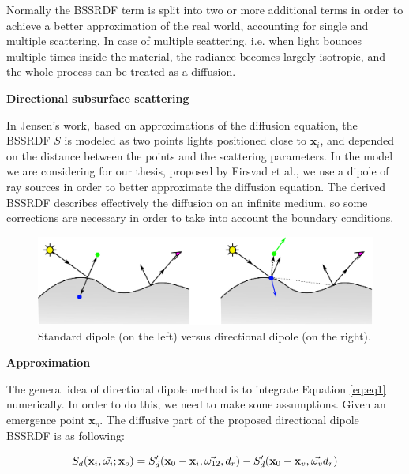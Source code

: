\documentclass[11pt]{article}
\begin{document}
Normally the BSSRDF term is split
 into two or more additional terms  in order to achieve a better approximation of the real world,
 accounting for single and multiple scattering. In case of multiple scattering, 
i.e. when light bounces multiple times inside the material, the radiance becomes largely isotropic, and the 
whole process can be treated as a diffusion.

\vspace{0.6cm}
{\bf Directional subsurface scattering}
\vspace{0.6cm}

In Jensen's work, based on approximations of the diffusion equation, the BSSRDF $S$ is modeled as two 
points lights positioned close to $\mathbf{x}_i$, and depended on the distance between the points and the 
scattering parameters. In the model we are considering for our thesis,
 proposed by Firsvad et al., we use a dipole 
of ray sources in order to better approximate the diffusion equation.
 The derived BSSRDF describes effectively the diffusion on an infinite medium, 
so some corrections are necessary in order to take into account the boundary conditions.

\begin{figure}
\begin{center}
\includegraphics[scale = 0.6]{./images/comparison.eps} 

\caption{Standard dipole (on the left) versus directional dipole (on the right). }
\end{center}
\end{figure}

\vspace{0.6cm}
{\bf Approximation}
\vspace{0.6cm}

The general idea of directional dipole method is to integrate Equation \ref{eq:eq1}
 numerically. In order to do this, we need to make some assumptions. Given an emergence point $\mathbf{x}_o$.
The diffusive part of the
proposed directional dipole BSSRDF is as following:

$$
S_d({\bf x}_i, \vec{\omega_i}; {\bf x}_o)  = S'_d({\bf x}_0 - {\bf x}_i,
\vec{\omega_{12}}, d_r) - S'_d({\bf x}_0 - {\bf x}_v, \vec{\omega_v}
d_r)
$$
\end{document}
